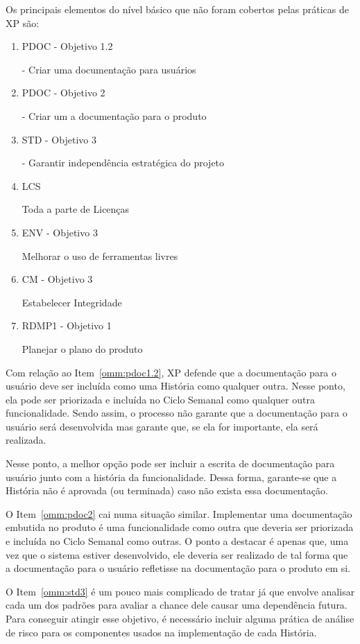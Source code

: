 Os principais elementos do nível básico que não foram cobertos pelas
práticas de XP são:

\begin{enumerate}
\item PDOC - Objetivo 1.2

  - Criar uma documentação para usuários
  \label{omm:pdoc1.2}
\item PDOC - Objetivo 2

  - Criar um a documentação para o produto
  \label{omm:pdoc2}
\item STD - Objetivo 3

  - Garantir independência estratégica do projeto
  \label{omm:std3}
\item LCS

  Toda a parte de Licenças
  \label{omm:lcs}
\item ENV - Objetivo 3

  Melhorar o uso de ferramentas livres
  \label{omm:env3}
\item CM - Objetivo 3

  Estabelecer Integridade
  \label{omm:cm3}
\item RDMP1 - Objetivo 1

  Planejar o plano do produto
  \label{omm:rdmp11}
\end{enumerate}

Com relação ao Item~\ref{omm:pdoc1.2}, XP defende que a documentação
para o usuário deve ser incluída como uma História como qualquer
outra. Nesse ponto, ela pode ser priorizada e incluída no Ciclo
Semanal como qualquer outra funcionalidade. Sendo assim, o processo
não garante que a documentação para o usuário será desenvolvida mas
garante que, se ela for importante, ela será realizada.

Nesse ponto, a melhor opção pode ser incluir a escrita de documentação
para usuário junto com a história da funcionalidade. Dessa forma,
garante-se que a História não é aprovada (ou terminada) caso não
exista essa documentação.

O Item~\ref{omm:pdoc2} cai numa situação similar. Implementar uma
documentação embutida no produto é uma funcionalidade como outra que
deveria ser priorizada e incluída no Ciclo Semanal como outras. O
ponto a destacar é apenas que, uma vez que o sistema estiver
desenvolvido, ele deveria ser realizado de tal forma que a
documentação para o usuário refletisse na documentação para o produto
em si.

O Item~\ref{omm:std3} é um pouco mais complicado de tratar já que
envolve analisar cada um dos padrões para avaliar a chance dele causar
uma dependência futura. Para conseguir atingir esse objetivo, é
necessário incluir alguma prática de análise de risco para os
componentes usados na implementação de cada História.

